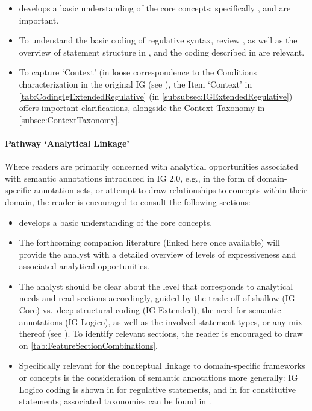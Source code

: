 \begin{itemize}
\item {} develops a basic understanding of the core concepts; specifically , and  are important.
\item To understand the basic coding of regulative syntax, review , as well as the overview of statement structure in , and the coding described in  are relevant.
\item To capture `Context' (in loose correspondence to the Conditions characterization in the original IG (see \cite{Brady2018InstitutionalGuidelines}), the Item `Context' in \cref{tab:CodingIgExtendedRegulative} (in \cref{subsubsec:IGExtendedRegulative}) offers important clarifications, alongside the Context Taxonomy in \cref{subsec:ContextTaxonomy}.
\end{itemize}

\paragraph{Pathway `Analytical Linkage'}

Where readers are primarily concerned with analytical opportunities associated with semantic annotations introduced in IG 2.0, e.g., in the form of domain-specific annotation sets, or attempt to draw relationships to concepts within their domain, the reader is encouraged to consult the following sections:

\begin{itemize}
\item {} develops a basic understanding of the core concepts.
\item The forthcoming companion literature (linked here once available) will provide the analyst with a detailed overview of levels of expressiveness and associated analytical opportunities. 
\item The analyst should be clear about the level that corresponds to analytical needs and read sections accordingly, guided by the trade-off of shallow (IG Core) vs.~deep structural coding (IG Extended), the need for semantic annotations (IG Logico), as well as the involved statement types, or any mix thereof (see ). To identify relevant sections, the reader is encouraged to draw on \cref{tab:FeatureSectionCombinations}. 
\item Specifically relevant for the conceptual linkage to domain-specific frameworks or concepts is the consideration of semantic annotations more generally: IG Logico coding is shown in  for regulative statements, and in  for constitutive statements; associated taxonomies can be found in .
\end{itemize}

